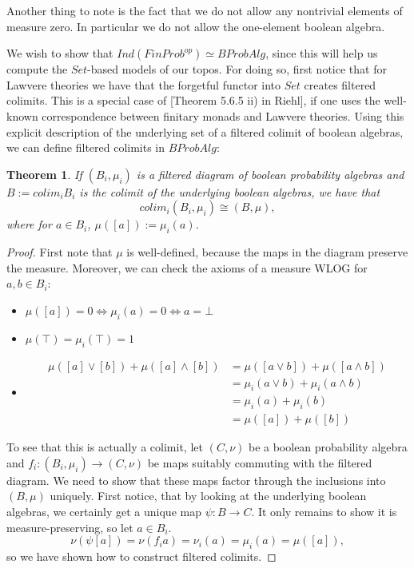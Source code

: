 \documentclass[a4paper,draft]{amsproc}
\theoremstyle{plain}
\newtheorem{theorem}{Theorem}[section]
\theoremstyle{definition}
\theoremstyle{remark}
\numberwithin{equation}{section}
\begin{document}
Another thing to note is the fact that we do not allow any nontrivial elements of measure zero. In particular we do not allow the one-element boolean algebra.

We wish to show that $Ind(FinProb^{op}) \simeq BProbAlg$, since this will help us compute the $Set$-based models of our topos. For doing so, first notice that for Lawvere theories we have that the forgetful functor into $Set$ creates filtered colimits. This is a special case of [Theorem 5.6.5 ii) in Riehl], if one uses the well-known correspondence between finitary monads and Lawvere theories. Using this explicit description of the underlying set of a filtered colimit of boolean algebras, we can define filtered colimits in $BProbAlg$:

\begin{theorem} 
If $(B_i, \mu_i)$ is a filtered diagram of boolean probability algebras and $B := colim_i B_i$ is the colimit of the underlying boolean algebras, we have that
\[
colim_i (B_i, \mu_i) \cong (B, \mu),
\]
where for $a \in B_i$, $\mu([a]) := \mu_i(a)$.
\end{theorem}
\begin{proof}
First note that $\mu$ is well-defined, because the maps in the diagram preserve the measure. Moreover, we can check the axioms of a measure WLOG for $a,b \in B_i$:
\begin{itemize}
\item $\mu([a]) = 0 \Leftrightarrow \mu_i(a) = 0 \Leftrightarrow a = \bot$
\item $\mu(\top) = \mu_i(\top) = 1$
\item \begin{align*}
\mu([a] \vee [b]) + \mu([a] \wedge [b]) &= \mu([a \vee b]) + \mu([a \wedge b]) \\
&= \mu_i(a \vee b) + \mu_i(a \wedge b) \\
&= \mu_i(a) + \mu_i(b) \\
&= \mu([a]) + \mu([b])
\end{align*}
\end{itemize}
To see that this is actually a colimit, let $(C, \nu)$ be a boolean probability algebra and $f_i : (B_i, \mu_i) \to (C, \nu)$ be maps suitably commuting with the filtered diagram. We need to show that these maps factor through the inclusions into $(B, \mu)$ uniquely. First notice, that by looking at the underlying boolean algebras, we certainly get a unique map $\psi: B \to C$.  It only remains to show it is measure-preserving, so let $a \in B_i$.
\[
\nu(\psi [a]) = \nu(f_i a) = \nu_i(a) = \mu_i(a) = \mu([a]),
\]
so we have shown how to construct filtered colimits.
\end{proof}
\end{document}
